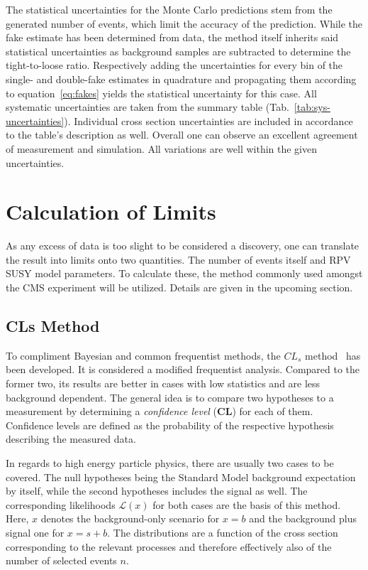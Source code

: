 The statistical uncertainties for the Monte Carlo predictions stem from the generated number of events, which limit the accuracy of the prediction. While the fake estimate has been determined from data, the method itself inherits said statistical uncertainties as background samples are subtracted to determine the tight-to-loose ratio. Respectively adding the uncertainties for every bin of the single- and double-fake estimates in quadrature and propagating them according to equation~\eqref{eq:fakes} yields the statistical uncertainty for this case. All systematic uncertainties are taken from the summary table (Tab.~\ref{tab:sys-uncertainties}). Individual cross section uncertainties are included in accordance to the table's description as well. Overall one can observe an excellent agreement of measurement and simulation. All variations are well within the given uncertainties.


\section{Calculation of Limits}
\label{sec:calc-of-limits}

As any excess of data is too slight to be considered a discovery, one can translate the result into limits onto two quantities. The number of events itself and RPV SUSY model parameters. To calculate these, the method commonly used amongst the CMS experiment will be utilized. Details are given in the upcoming section.


\subsection{CLs Method}
\label{sec:cls-method}

To compliment Bayesian and common frequentist methods, the $CL_s$ method~\cite{cls,cls2} has been developed. It is considered a modified frequentist analysis. Compared to the former two, its results are better in cases with low statistics and are less background dependent. The general idea is to compare two hypotheses to a measurement by determining a \textit{confidence level} (\textbf{CL}) for each of them. Confidence levels are defined as the probability of the respective hypothesis describing the measured data.

In regards to high energy particle physics, there are usually two cases to be covered. The null hypotheses being the Standard Model background expectation by itself, while the second hypotheses includes the signal as well. The corresponding likelihoods $\mathcal{L} (x)$ for both cases are the basis of this method. Here, $x$ denotes the background-only scenario for $x = b$ and the background plus signal one for $x = s + b$. The distributions are a function of the cross section corresponding to the relevant processes and therefore effectively also of the number of selected events $n$.

